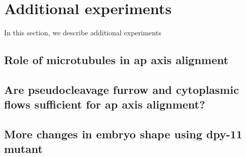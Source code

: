 \section{Additional experiments}\label{sec:additionalExp}
In this section, we describe additional experiments 


\subsection{Role of microtubules in \acs{ap} axis alignment}\label{subsec:MicrotubuleRoleGoa1Gpa16}
\subsection{Are pseudocleavage furrow and cytoplasmic flows sufficient for \acs{ap} axis alignment?}\label{subsec:sufficiencyTestAir1Nop1Mel11}
\subsection{More changes in embryo shape using dpy-11 mutant}\label{sec:moreRounderEmbryosDpy11Ima3}